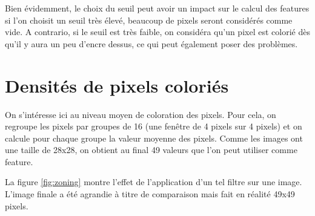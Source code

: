 Bien évidemment, le choix du seuil peut avoir un impact sur le calcul des 
features si l'on choisit un seuil très élevé, beaucoup de pixels seront 
considérés comme vide. A contrario, si le seuil est très faible, on considéra 
qu'un pixel est colorié dès qu'il y aura un peu d'encre dessus, ce qui peut 
également poser des problèmes.



\section{Densités de pixels coloriés}

On s'intéresse ici au niveau moyen de coloration des pixels. 
Pour cela, on regroupe les pixels par groupes de 16 (une fenêtre 
de 4 pixels sur 4 pixels) et on calcule pour chaque groupe la 
valeur moyenne des pixels.
Comme les images ont une taille de 28x28, on obtient au final 
49 valeurs que l'on peut utiliser comme feature.

La figure \ref{fig:zoning} montre l'effet de l'application 
d'un tel filtre sur une image. 
L'image finale a été agrandie à titre de comparaison mais 
fait en réalité 49x49 pixels.

